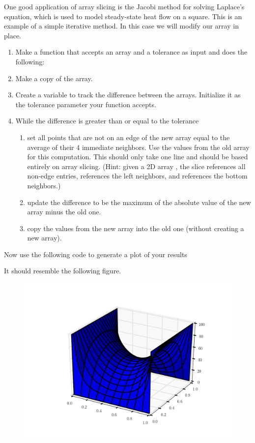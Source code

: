 \begin{problem} 
One good application of array slicing is the Jacobi
method for solving Laplace's equation, which is used to model
steady-state heat flow on a square. This is an example of a simple
iterative method. In this case we will modify our array in place. 
\begin{enumerate}
\item Make a function that accepts an array and a tolerance as input and does the
following: 
\item Make a copy of the array. 
\item Create a variable to track the difference between the arrays. Initialize
it as the tolerance parameter your function accepts. 
\item While the difference is greater than or equal
to the tolerance 
\begin{enumerate} 
\item set all points that are not on an edge of the new array equal to the average of their 4 immediate neighbors. Use the values from the old array for this computation. 
This should only take one line and should be based entirely on array slicing.
(Hint: given a 2D array , the slice  references
all non-edge entries,  references the left neighbors,
and  references the bottom neighbors.) 
\item update the difference to be the maximum of the absolute value of the new array
minus the old one. 
\item copy the values from the new array into the old
one (without creating a new array). 
\end{enumerate} 
\end{enumerate}

Now use the following code to generate a plot of your results
 
It should resemble the following figure.

\begin{figure}[H] 
\includegraphics[width=.75\textwidth]{laplace.pdf}
\end{figure} 
\end{problem}

